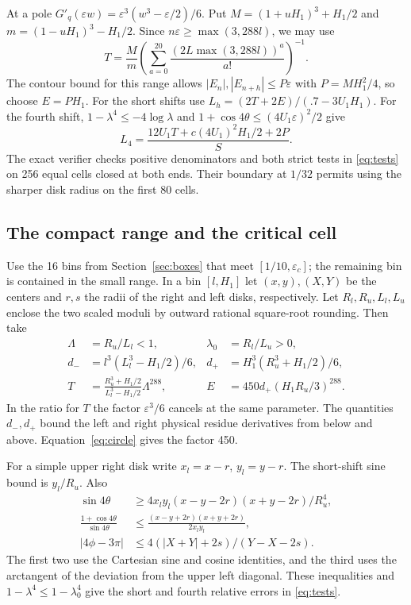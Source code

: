 \documentclass[11pt]{article}
\newcommand{\e}{\varepsilon}
\begin{document}
At a pole $G'_q(\e w)=\e^3(w^3-\e/2)/6$.
Put $M=(1+uH_1)^3+H_1/2$ and $m=(1-uH_1)^3-H_1/2$.
Since $n\e\ge\max(3,288l)$, we may use
\[
 T=\frac{M}{m}
    \left(\sum_{a=0}^{20}\frac{(2L\max(3,288l))^a}{a!}\right)^{-1}.
\]
The contour bound for this range allows
$|E_n|, |E_{n+h}|\le P\e$ with $P=MH_1^2/4$,
so choose $E=PH_1$. For the short shifts use
$L_h=(2T+2E)/(.7-3U_1H_1)$. For the fourth shift,
$1-\lambda^4\le -4\log\lambda$ and
$1+\cos4\theta\le (4U_1\e)^2/2$ give
\begin{equation}\label{eq:small-four}
 L_4=\frac{12U_1T+c(4U_1)^2H_1/2+2P}{S}.
\end{equation}
The exact verifier checks positive denominators and both strict
tests in \eqref{eq:tests} on 256 equal cells closed at both
ends. Their boundary at $1/32$ permits using the sharper disk
radius on the first 80 cells.

\subsection{The compact range and the critical cell}
Use the 16 bins from Section~\ref{sec:boxes} that meet
$[1/10,\e_c]$; the remaining bin is contained in the small
range. In a bin $[l,H_1]$ let $(x,y),(X,Y)$ be the centers
and $r,s$ the radii of the right and left disks, respectively.
Let $R_l,R_u,L_l,L_u$ enclose the two scaled moduli by
outward rational square-root rounding. Then take
\begin{align*}
 \Lambda&=R_u/L_l<1, &\lambda_0&=R_l/L_u>0,\\
 d_-&=l^3(L_l^3-H_1/2)/6, &d_+&=H_1^3(R_u^3+H_1/2)/6,\\
 T&=\frac{R_u^3+H_1/2}{L_l^3-H_1/2}\Lambda^{288},&
 E&=450d_+(H_1R_u/3)^{288}.
\end{align*}
In the ratio for $T$ the factor $\e^3/6$ cancels at the same
parameter. The quantities $d_-,d_+$ bound the left and right
physical residue derivatives from below and above.
Equation~\eqref{eq:circle} gives the factor 450.

For a simple upper right disk write $x_l=x-r$, $y_l=y-r$.
The short-shift sine bound is $y_l/R_u$. Also
\begin{align*}
 \sin4\theta&\ge
 4x_ly_l(x-y-2r)(x+y-2r)/R_u^4,\\
 \frac{1+\cos4\theta}{\sin4\theta}
 &\le\frac{(x-y+2r)(x+y+2r)}{2x_ly_l},\\
 |4\phi-3\pi|&\le 4(|X+Y|+2s)/(Y-X-2s).
\end{align*}
The first two use the Cartesian sine and cosine identities,
and the third uses the arctangent of the deviation from
the upper left diagonal. These inequalities and
$1-\lambda^4\le1-\lambda_0^4$ give the short and fourth
relative errors in \eqref{eq:tests}.
\end{document}
